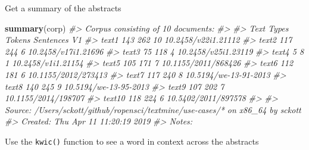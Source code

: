 \documentclass[author-year, review, 11pt]{components/elsarticle} %
\newenvironment{Shaded}{\begin{snugshade}}{\end{snugshade}}
\newcommand{\CommentTok}[1]{\textcolor[rgb]{0.56,0.35,0.01}{\textit{#1}}}
\newcommand{\KeywordTok}[1]{\textcolor[rgb]{0.13,0.29,0.53}{\textbf{#1}}}
\newcommand{\NormalTok}[1]{#1}
\begin{document}
Get a summary of the abstracts

\begin{Shaded}
\begin{Highlighting}[]
\KeywordTok{summary}\NormalTok{(corp)}
\CommentTok{#> Corpus consisting of 10 documents:}
\CommentTok{#> }
\CommentTok{#>    Text Types Tokens Sentences                    V1}
\CommentTok{#>   text1   143    262        10   10.2458/v22i1.21112}
\CommentTok{#>   text2   117    244         6   10.2458/v17i1.21696}
\CommentTok{#>   text3    75    118         4   10.2458/v25i1.23119}
\CommentTok{#>   text4     5      8         1    10.2458/v1i1.21154}
\CommentTok{#>   text5   105    171         7   10.1155/2011/868426}
\CommentTok{#>   text6   112    181         6   10.1155/2012/273413}
\CommentTok{#>   text7   117    240         8 10.5194/we-13-91-2013}
\CommentTok{#>   text8   140    245         9 10.5194/we-13-95-2013}
\CommentTok{#>   text9   107    202         7   10.1155/2014/198707}
\CommentTok{#>  text10   118    224         6   10.5402/2011/897578}
\CommentTok{#> }
\CommentTok{#> Source: /Users/sckott/github/ropensci/textmine/use-cases/* on x86_64 by sckott}
\CommentTok{#> Created: Thu Apr 11 11:20:19 2019}
\CommentTok{#> Notes:}
\end{Highlighting}
\end{Shaded}

Use the \texttt{kwic()} function to see a word in context across the
abstracts
\end{document}

